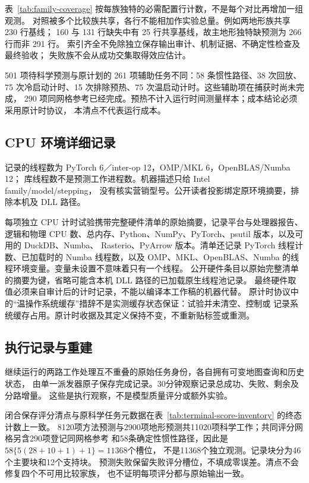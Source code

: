 \documentclass[UTF8,11pt]{ctexart}
\begin{document}
表~\ref{tab:family-coverage} 按每族独特的必需配置行计数，不是每个对比再增加一组观测。
对照被多个比较族共享，各行不能相加作实验总量。例如两地形族共享 230 行基线；
160 与 131 行缺失中有 25 行共享基线，故主地形独特缺预测为 266 行而非 291 行。
索引齐全不免除独立保存输出审计、机制证据、不确定性检查及最终验收；
失败族不会从成功交集取得效应估计。

501 项待科学预测与原计划的 261 项辅助任务不同：58 条惯性路径、38 次回放、
75 次冷启动计时、15 次排除预热、75 次温启动计时。这些辅助项在捕获时尚未完成，
290 项同网格参考已经完成。预热不计入运行时间测量样本；成本结论必须采用原计时协议，
本清点不代表运行成本。



\Needspace{.70\textheight}

\Needspace{.70\textheight}


\subsection{CPU 环境详细记录}
\label{sec:runtime-record-details}
记录的线程数为 PyTorch 6／inter-op 12，OMP/MKL 6，OpenBLAS/Numba 12；
库线程数不是预测工作进程数。机器描述只给 Intel family/model/stepping，
没有核实营销型号。公开读者投影绑定原环境摘要，排除本机及 DLL 路径。

每项独立 CPU 计时试验携带完整硬件清单的原始摘要，记录平台与处理器报告、逻辑和物理
CPU 数、总内存、Python、NumPy、PyTorch、psutil 版本，以及可用的 DuckDB、Numba、
Rasterio、PyArrow 版本。清单还记录 PyTorch 线程计数、已加载时的 Numba 线程数，以及
OMP、MKL、OpenBLAS、Numba 的线程环境变量。变量未设置不意味着只有一个线程。
公开硬件条目以原始完整清单的摘要为键，省略可能含本机 DLL 路径的已加载原生线程池记录。
最终硬件取值必须来自审计后的计时记录，不能以编译本工作稿的机器代替。
原计时协议中的“温操作系统缓存”措辞不是实测缓存状态保证：试验并未清空、控制或
记录系统缓存占用。原计时收据及其定义保持不变，不重新贴标签或重测。

\subsection{执行记录与重建}
\label{sec:execution-reconstruction}
继续运行的两路工作处理互不重叠的原始任务身份，各自拥有可变地图查询和历史状态，
由单一派发器原子保存完成记录。30分钟观察记录总成功、失败、剩余及分路增量。
这些是执行观察，不是模型质量评分或额外实验。

闭合保存评分清点与原科学任务元数据在表~\ref{tab:terminal-score-inventory} 的终态计数上一致。
8120项方法预测与2900项地形预测共11020项科学工作；共同评分网格另含290项登记同网格参考
和58条确定性惯性路径，因此是$58\{5(28+10+1)+1\}=11368$个槽位，
不是11368个独立观测。记录块分为46个主要块和12个支持块。
预测失败保留失败评分槽位，不填成零误差。清点不会修复四个不可用比较家族，
也不证明每项评分都与原始输出一致。
\end{document}
